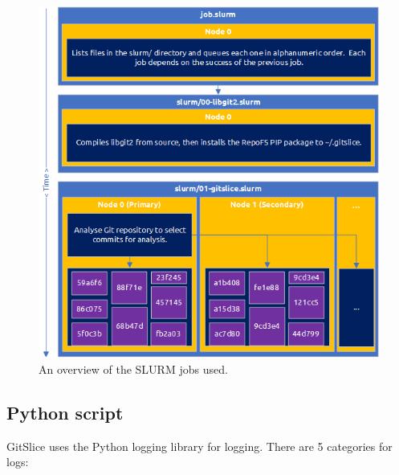 \documentclass[11pt]{article}
\begin{document}
    \begin{figure}[h]
        \centering
        \includegraphics{slurm_overview}
        \caption{An overview of the SLURM jobs used.}
        \label{fig:slurm_overview}
    \end{figure}

    \subsection{Python script}
    \label{subsec:python-script}

    GitSlice uses the Python logging library for logging.
    There are 5 categories for logs:
\end{document}
